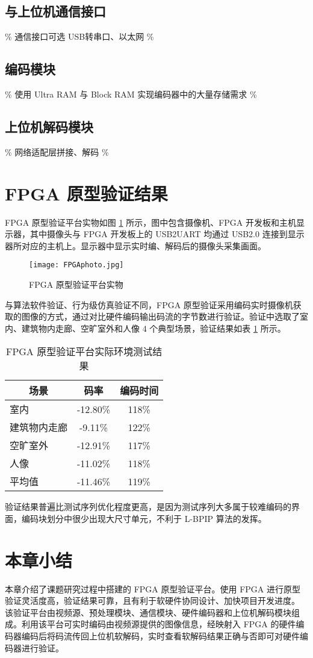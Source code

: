 \subsection{与上位机通信接口}
\% 通信接口可选 USB转串口、以太网 \%

\subsection{编码模块}
\% 使用 Ultra RAM 与 Block RAM 实现编码器中的大量存储需求 \%

\subsection{上位机解码模块}
\% 网络适配层拼接、解码 \%

\section{FPGA 原型验证结果}
FPGA 原型验证平台实物如图 \ref{fig:FPGAphoto} 所示，图中包含摄像机、FPGA 开发板和主机显示器，其中摄像头与 FPGA 开发板上的 USB2UART 均通过 USB2.0 连接到显示器所对应的主机上。显示器中显示实时编、解码后的摄像头采集画面。
\begin{figure}[hbt]
    \centering
    \texttt{[image: FPGAphoto.jpg]}
    \caption{FPGA 原型验证平台实物}
    \label{fig:FPGAphoto}
\end{figure}

与算法软件验证、行为级仿真验证不同，FPGA 原型验证采用编码实时摄像机获取的图像的方式，通过对比硬件编码输出码流的字节数进行验证。验证中选取了室内、建筑物内走廊、空旷室外和人像 4 个典型场景，验证结果如表 \ref{tab:FPGADemoTestTab} 所示。
\begin{table}[hbt]
    \centering
    \caption{FPGA 原型验证平台实际环境测试结果}
    \label{tab:FPGADemoTestTab}
    \begin{tabular}{@{}lcc@{}}
        \toprule
        \multicolumn{1}{c}{场景} & 码率     & 编码时间 \\ \midrule
        室内                     & -12.80\% & 118\%    \\
        建筑物内走廊             & -9.11\%  & 122\%    \\
        空旷室外                 & -12.91\% & 117\%    \\
        人像                     & -11.02\% & 118\%    \\ \midrule
        平均值                   & -11.46\% & 119\%    \\ \bottomrule
    \end{tabular}
\end{table}

验证结果普遍比测试序列优化程度更高，是因为测试序列大多属于较难编码的界面，编码块划分中很少出现大尺寸单元，不利于 L-BPIP 算法的发挥。

\section{本章小结}
本章介绍了课题研究过程中搭建的 FPGA 原型验证平台。使用 FPGA 进行原型验证灵活度高，验证结果可靠，且有利于软硬件协同设计、加快项目开发进度。
该验证平台由视频源、预处理模块、通信模块、硬件编码器和上位机解码模块组成。利用该平台可实时编码由视频源提供的图像信息，经映射入 FPGA 的硬件编码器编码后将码流传回上位机软解码，实时查看软解码结果正确与否即可对硬件编码器进行验证。